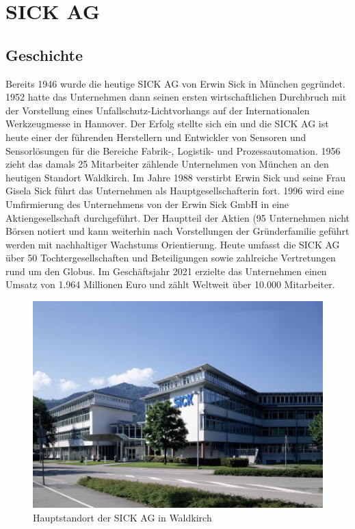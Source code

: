 \newpage

\section{SICK AG}
\subsection{Geschichte}
Bereits 1946 wurde die heutige SICK AG von Erwin Sick in München gegründet. 1952 hatte
das Unternehmen dann seinen ersten wirtschaftlichen Durchbruch mit der Vorstellung eines
Unfallschutz-Lichtvorhangs auf der Internationalen Werkzeugmesse in Hannover. Der Erfolg
stellte sich ein und die SICK AG ist heute einer der führenden Herstellern und Entwickler
von Sensoren und Sensorlösungen für die Bereiche Fabrik-, Logistik- und Prozessautomation.
1956 zieht das damals 25 Mitarbeiter zählende Unternehmen von München an den heutigen
Standort Waldkirch. Im Jahre 1988 verstirbt Erwin Sick und seine Frau Gisela Sick führt das
Unternehmen als Hauptgesellschafterin fort. 1996 wird eine Umfirmierung des Unternehmens
von der Erwin Sick GmbH in eine Aktiengesellschaft durchgeführt. Der Hauptteil der Aktien
(95%
Unternehmen nicht Börsen notiert und kann weiterhin nach Vorstellungen der Gründerfamilie
geführt werden mit nachhaltiger Wachstums Orientierung. Heute umfasst die SICK AG über 50
Tochtergesellschaften und Beteiligungen sowie zahlreiche Vertretungen rund um den Globus. Im
Geschäftsjahr 2021 erzielte das Unternehmen einen Umsatz von 1.964 Millionen Euro
und zählt Weltweit über 10.000 Mitarbeiter.

\begin{figure}[h]
\centering
\includegraphics[width=13cm]{Bilder/SICK AG Hauptsitz.jpg}
\caption{Hauptstandort der SICK AG in Waldkirch}
\label{SICK_AG_Hauptsitz}
\end{figure}


